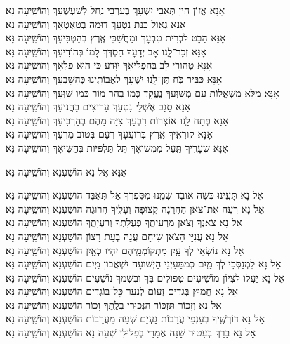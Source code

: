 \documentclass[twoside, openany, parskip=half, 11pt]{book}
\begin{document}
\begin{small}
אָנָּא אֱזוֹן חִין תְּאֵבֵי יִשְׁעָךְ בְּעַרְבֵי נַֽחַל לְשַׁעְשְׁעָךְ \hfill וְהוֹשִֽׁיעָה נָּא׃\\
אָנָּא גְּאוֹל כַּנַּת נִטְעָךְ דּוּמָה בְּטַאְטְאָךְ \hfill וְהוֹשִֽׁיעָה נָּא׃\\
אָנָּא הַבֵּט לִבְרִית טִבְעָךְ וּמַחֲשַׁכֵּי אֶֽרֶץ בְּהַטְבִּיעָךְ \hfill וְהוֹשִֽׁיעָה נָּא׃\\
אָנָּא זְכָר־לָֽנוּ אָב יְדָעָךְ חַסְדְּךָ לָֽמוֹ בְּהוֹדִיעָךְ \hfill וְהוֹשִֽׁיעָה נָּא׃\\
אָנָּא טְהוֹרֵי לֵב בְּהַפְלִיאָךְ יִוָּדַע כִּי הוּא פִלְאָךְ \hfill וְהוֹשִֽׁיעָה נָּא׃\\
אָנָּא כַּבִּיר כֹּֽחַ תֶּן־לָֽנוּ יִשְׁעָךְ לַאֲבוֹתֵֽינוּ כְּהִשָּׁבְעָךְ \hfill וְהוֹשִֽׁיעָה נָּא׃\\
אָנָּא מַלֵּא מִשְׁאֲלוֹת עַם מְשַׁוְּעָךְ נֶעֱקָד כְּמוֹ בְּהַר מוֹר כְּמוֹ שִׁוְּעָךְ \hfill וְהוֹשִֽׁיעָה נָּא׃\\
אָנָּא סַגֵּב אֶשְׁלֵי נִטְעָךְ עָרִיצִים בַּהֲנִיעָךְ \hfill וְהוֹשִֽׁיעָה נָּא׃\\
אָנָּא פְּתַח לָֽנוּ אוֹצְרוֹת רִבְעָךְ צִיָּה מֵהֶם בְּהַרְבִּיעָךְ \hfill וְהוֹשִֽׁיעָה נָּא׃\\
אָנָּא קוֹרְאֶֽיךָ אֶֽרֶץ בְּרוֹעֲעָךְ רְעֵם בְּטוּב מִרְעָךְ \hfill וְהוֹשִֽׁיעָה נָּא׃\\
אָנָּא שְׁעָרֶֽיךָ תַּֽעַל מִמְּשׁוֹאָךְ תֵּל תַּלְפִּיּוֹת בְּהַשִּׂיאָךְ \hfill וְהוֹשִֽׁיעָה נָּא׃

\end{small}

\begin{large}
\shatzvkahal
אָנָּא אֵל נָא הוֹשַׁעְנָא וְהוֹשִֽׁיעָה נָּא׃

\end{large}

\begin{small}
אֵל נָא תָּעִֽינוּ כְּשֶׂה אוֹבֵד שְׁמֵֽנוּ מִסִּפְרְךָ אַל תְּאַבֵּד \hfill הוֹשַׁעְנָא וְהוֹשִֽׁיעָה נָּא׃ \\
אֵל נָא רְעֵה אֶת־צֹאן הַהֲרֵגָה קְצוּפָה וְעָלֶֽיךָ הֲרוּגָה \hfill הוֹשַׁעְנָא וְהוֹשִֽׁיעָה נָּא׃\\
אֵל נָא צֹאנְךָ וְצֹאן מַרְעִיתֶֽךָ פְּעֻלָּתְךָ וְרַעְיָתֶֽךָ \hfill הוֹשַׁעְנָא וְהוֹשִֽׁיעָה נָּא׃\\
אֵל נָא עֲנִיֵּי הַצֹּאן שִׂיחָם עֲנֵה בְּעֵת רָצוֹן \hfill הוֹשַׁעְנָא וְהוֹשִֽׁיעָה נָּא׃\\
אֵל נָא נוֹשְׂאֵי לְךָ עַֽיִן מִתְקוֹמְמֵֽיהֶם יִהְיוּ כְאַֽיִן \hfill הוֹשַׁעְנָא וְהוֹשִֽׁיעָה נָּא׃\\
אֵל נָא לִמְנַסְּכֵי לְךָ מַֽיִם כְּמִמַּעַיְנֵי הַיְשׁוּעָה יִשְׁאֲבוּן מַֽיִם \hfill הוֹשַׁעְנָא וְהוֹשִֽׁיעָה נָּא׃\\
אֵל נָא יַעֲלוּ לְצִיּוֹן מוֹשִׁיעִים טְפוּלִים בְּךָ וּבְשִׁמְךָ נוֹשָׁעִים \hfill הוֹשַׁעְנָא וְהוֹשִֽׁיעָה נָּא׃\\
אֵל נָא חֲמוּץ בְּגָדִים זְעוֹם לְנַעֵר כׇּל־בּוֹגְדִים \hfill הוֹשַׁעְנָא וְהוֹשִֽׁיעָה נָּא׃\\
אֵל נָא וְזָכוֹר תִּזְכּוֹר הַנְּכוּרֵי בְּלֶֽתֶךְ וָכוֹר \hfill הוֹשַׁעְנָא וְהוֹשִֽׁיעָה נָּא׃\\
אֵל נָא דּוֹרְשֶֽׁיךָ בְּעַנְפֵי עֲרָבוֹת גַּעְיָם שְׁעֵה מֵעֲרָבוֹת \hfill הוֹשַׁעְנָא וְהוֹשִֽׁיעָה נָּא׃\\
אֵל נָא בָּרֵךְ בְּעִטּוּר שָׁנָה אֲמָרַי בְּפִלּוּלִי שְׁעֵה נָא \hfill הוֹשַׁעְנָא וְהוֹשִֽׁיעָה נָּא׃

\end{small}
\end{document}
